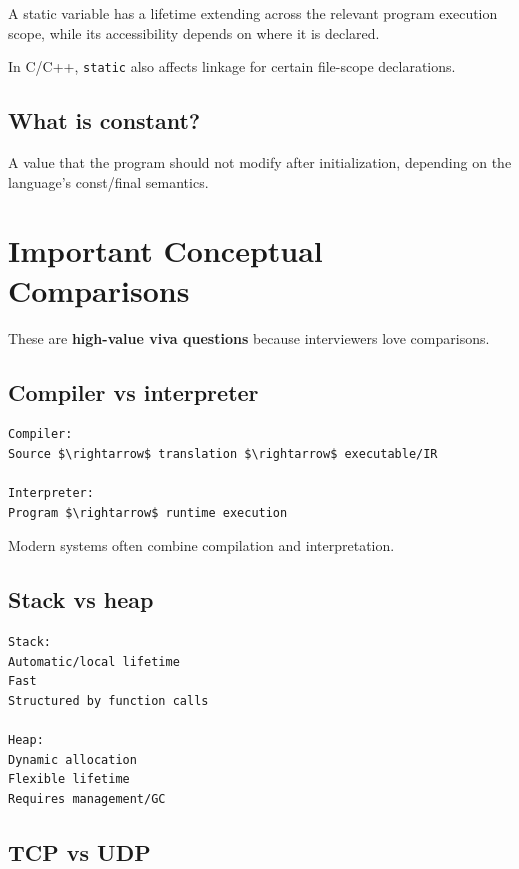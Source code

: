 A static variable has a lifetime extending across the relevant program execution scope, while its accessibility depends on where it is declared.

In C/C++, \texttt{static} also affects linkage for certain file-scope declarations.

\medskip

\subsection{What is constant?}

A value that the program should not modify after initialization, depending on the language's const/final semantics.

\medskip

\section{Important Conceptual Comparisons}

These are \textbf{high-value viva questions} because interviewers love comparisons.

\subsection{Compiler vs interpreter}

\begin{lstlisting}
Compiler:
Source $\rightarrow$ translation $\rightarrow$ executable/IR

Interpreter:
Program $\rightarrow$ runtime execution
\end{lstlisting}

Modern systems often combine compilation and interpretation.

\medskip

\subsection{Stack vs heap}

\begin{lstlisting}
Stack:
Automatic/local lifetime
Fast
Structured by function calls

Heap:
Dynamic allocation
Flexible lifetime
Requires management/GC
\end{lstlisting}

\medskip

\subsection{TCP vs UDP}

